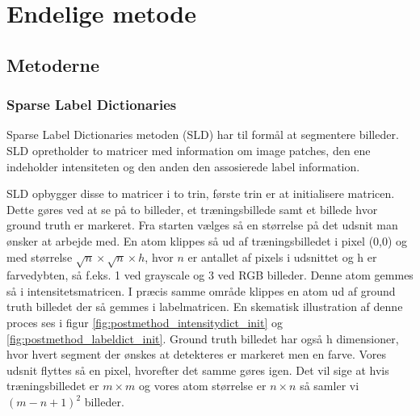 \section{Endelige metode}
\subsection{Metoderne}
\subsubsection{Sparse Label Dictionaries}	%



Sparse Label Dictionaries metoden (SLD) har til formål at segmentere billeder. SLD opretholder to matricer med information om image patches, den ene indeholder intensiteten og den anden den assosierede label information.

SLD opbygger disse to matricer i to trin, første trin er at initialisere matricen. Dette gøres ved at se på to billeder, et træningsbillede samt et billede hvor ground truth er markeret. Fra starten vælges så en størrelse på det udsnit man ønsker at arbejde med. En atom klippes så ud af træningsbilledet i pixel (0,0) og med størrelse $\sqrt{n}\times\sqrt{n}\times h$, hvor $n$ er antallet af pixels i udsnittet og h er farvedybten, så f.eks. 1 ved grayscale og 3 ved RGB billeder. Denne atom gemmes så i intensitetsmatricen. I præcis samme område klippes en atom ud af ground truth billedet der så gemmes i labelmatricen. En skematisk illustration af denne proces ses i figur \ref{fig:postmethod_intensitydict_init} og \ref{fig:postmethod_labeldict_init}. Ground truth billedet har også h dimensioner, hvor hvert segment der ønskes at detekteres er markeret men en farve. Vores udsnit flyttes så en pixel, hvorefter det samme gøres igen. Det vil sige at hvis træningsbilledet er $m\times m$ og vores atom størrelse er $n\times n$ så samler vi $(m-n+1)^2$ billeder. 

